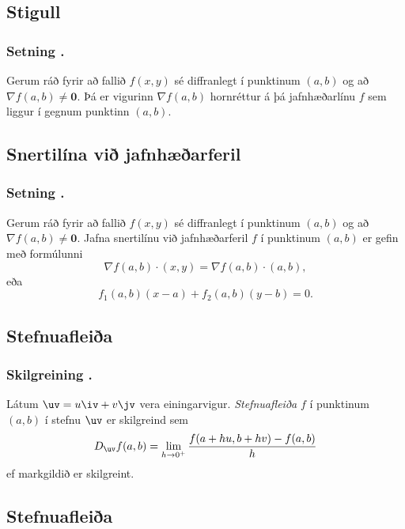 \subsection{Stigull} 

\subsubsection{Setning \kaflanr.}
  Gerum ráð fyrir að fallið $f(x,y)$ sé
diffranlegt í punktinum $(a,b)$ og að $\nabla f(a,b) \neq \mathbf{0}$.  Þá er vigurinn $\nabla f(a,b)$ 
hornréttur á þá jafnhæðarlínu $f$ sem liggur í gegnum punktinn $(a,b)$.








\subsection{Snertilína við jafnhæðarferil} 

\subsubsection{Setning \kaflanr.}
  Gerum ráð fyrir að fallið $f(x,y)$ sé
diffranlegt í punktinum $(a,b)$ og að $\nabla f(a,b) \neq \mathbf{0}$.  Jafna snertilínu við jafnhæðarferil $f$ í punktinum $(a,b)$ er gefin
með formúlunni 
$$\nabla f(a,b)\cdot (x,y)=\nabla f(a,b)\cdot (a,b),$$
eða 
$$f_1(a,b)(x-a)+f_2(a,b)(y-b)=0.$$




\subsection{Stefnuafleiða} 

\subsubsection{Skilgreining \kaflanr.}
 Látum $\uv=u\iv+v\jv$ vera einingarvigur.  {\em
  Stefnuafleiða } $f$ í punktinum $(a,b)$ í stefnu $\uv$ er skilgreind
  sem 
$$D_{\uv}f(a,b)=\lim_{h\rightarrow 0^+}\frac{f(a+hu, b+hv)-f(a,b)}{h}$$
ef markgildið er skilgreint.  




\subsection{Stefnuafleiða} 

